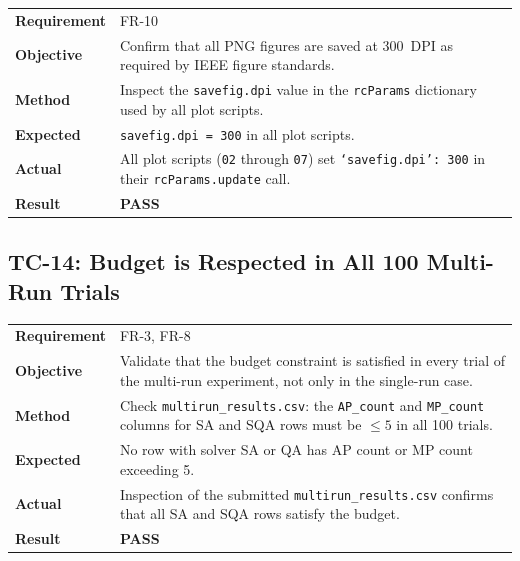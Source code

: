 \documentclass[12pt,a4paper]{article}
\newcommand{\pass}{\textcolor{green!50!black}{\textbf{PASS}}}
\begin{document}
\begin{table}[h!]
\renewcommand{\arraystretch}{1.3}
\begin{tabular}{@{}lp{10cm}@{}}
\toprule
\textbf{Requirement} & FR-10 \\
\textbf{Objective} & Confirm that all PNG figures are saved at 300~DPI
    as required by IEEE figure standards. \\
\textbf{Method} & Inspect the \texttt{savefig.dpi} value in the
    \texttt{rcParams} dictionary used by all plot scripts. \\
\textbf{Expected} & \texttt{savefig.dpi = 300} in all plot scripts. \\
\textbf{Actual} & All plot scripts (\texttt{02} through \texttt{07})
    set \texttt{`savefig.dpi': 300} in their \texttt{rcParams.update}
    call. \\
\textbf{Result} & \pass \\
\bottomrule
\end{tabular}
\end{table}

\subsection{TC-14: Budget is Respected in All 100 Multi-Run Trials}

\begin{table}[h!]
\renewcommand{\arraystretch}{1.3}
\begin{tabular}{@{}lp{10cm}@{}}
\toprule
\textbf{Requirement} & FR-3, FR-8 \\
\textbf{Objective} & Validate that the budget constraint is satisfied
    in every trial of the multi-run experiment, not only in the
    single-run case. \\
\textbf{Method} & Check \texttt{multirun\_results.csv}: the
    \texttt{AP\_count} and \texttt{MP\_count} columns for SA and SQA
    rows must be $\leq 5$ in all 100 trials. \\
\textbf{Expected} & No row with solver SA or QA has AP count or
    MP count exceeding 5. \\
\textbf{Actual} & Inspection of the submitted \texttt{multirun\_results.csv}
    confirms that all SA and SQA rows satisfy the budget. \\
\textbf{Result} & \pass \\
\bottomrule
\end{tabular}
\end{table}

\end{document}
